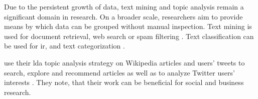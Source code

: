 
Due to the persistent growth of data, text mining and topic analysis remain a significant domain in research.
On a broader scale, researchers aim to provide means by which data can be grouped without manual inspection.
Text mining is used for document retrieval, web search or spam filtering \cite{clusteringDocs2020}.
Text classification can be used for \ac{ir}, and text categorization \cite{tfidf2008}.

\citeauthor{text_mining2016} use their \ac{lda} topic analysis strategy on Wikipedia articles and users' tweets to search, explore and recommend articles 
as well as to analyze Twitter users' interests \cite{text_mining2016}.
They note, that their work can be beneficial for social and business research.